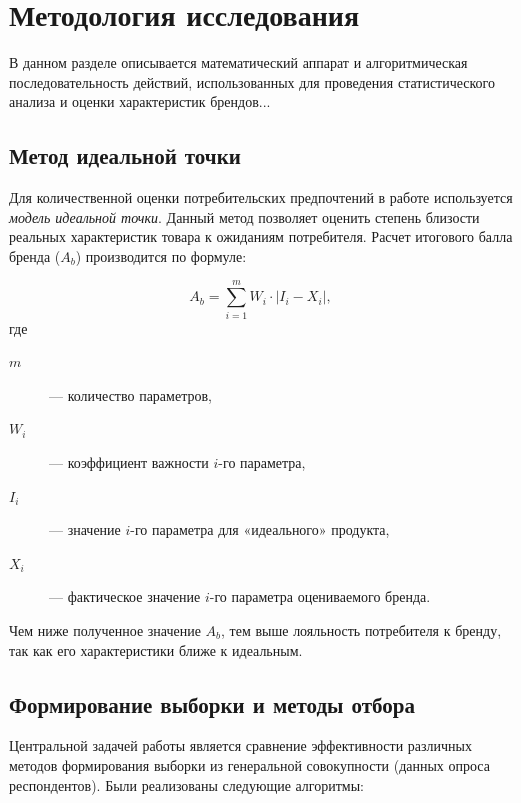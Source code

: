 \section{Методология исследования}

В данном разделе описывается математический аппарат и алгоритмическая последовательность действий, использованных для проведения статистического анализа и оценки характеристик брендов...

\subsection{Метод идеальной точки}

Для количественной оценки потребительских предпочтений в работе используется \textit{модель идеальной точки}. Данный метод позволяет оценить степень близости реальных характеристик товара к ожиданиям потребителя. Расчет итогового балла бренда ($A_b$) производится по формуле:

\begin{equation}
    \label{eq:integral_score}
    A_{b} = \sum_{i=1}^{m} W_{i} \cdot |I_{i} - X_{i}|  ,
\end{equation}
где 
\begin{description}
    \item[$m$] --- количество параметров, 
    \item[$W_i$] --- коэффициент важности $i$-го параметра, 
    \item[$I_i$] --- значение $i$-го параметра для «идеального» продукта, 
    \item[$X_i$] --- фактическое значение $i$-го параметра оцениваемого бренда.
\end{description}

Чем ниже полученное значение $A_b$, тем выше лояльность потребителя к бренду, так как его характеристики ближе к идеальным.

\subsection{Формирование выборки и методы отбора}

Центральной задачей работы является сравнение эффективности различных методов формирования выборки из генеральной совокупности (данных опроса респондентов). Были реализованы следующие алгоритмы:

